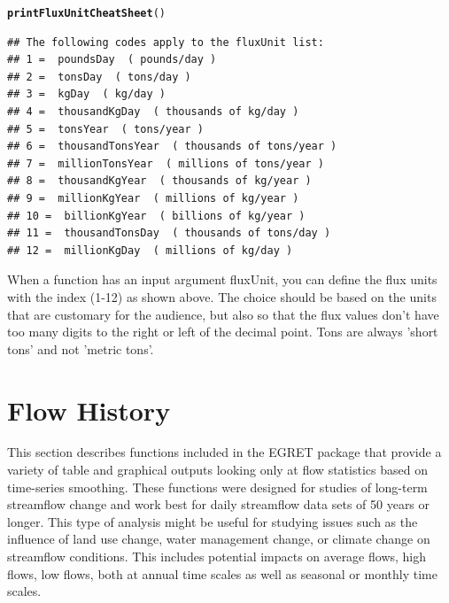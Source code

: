 \documentclass[a4paper,11pt]{article}\usepackage{graphicx, color}
\makeatletter
\newcommand{\hlfunctioncall}[1]{\textcolor[rgb]{0.501960784313725,0,0.329411764705882}{\textbf{#1}}}%
\newenvironment{kframe}{%
 \def\at@end@of@kframe{}%
 \ifinner\ifhmode%
  \def\at@end@of@kframe{\end{minipage}}%
  \begin{minipage}{\columnwidth}%
 \fi\fi%
 \def\FrameCommand##1{\hskip\@totalleftmargin \hskip-\fboxsep
 \colorbox{shadecolor}{##1}\hskip-\fboxsep
     \hskip-\linewidth \hskip-\@totalleftmargin \hskip\columnwidth}%
 \MakeFramed {\advance\hsize-\width
   \@totalleftmargin\z@ \linewidth\hsize
   \@setminipage}}%
 {\par\unskip\endMakeFramed%
 \at@end@of@kframe}
\newenvironment{knitrout}{}{} %
\makeatother
\begin{document}
\begin{knitrout}
\color{fgcolor}\begin{kframe}
\begin{alltt}
\hlfunctioncall{printFluxUnitCheatSheet}()
\end{alltt}
\begin{verbatim}
## The following codes apply to the fluxUnit list:
## 1 =  poundsDay  ( pounds/day )
## 2 =  tonsDay  ( tons/day )
## 3 =  kgDay  ( kg/day )
## 4 =  thousandKgDay  ( thousands of kg/day )
## 5 =  tonsYear  ( tons/year )
## 6 =  thousandTonsYear  ( thousands of tons/year )
## 7 =  millionTonsYear  ( millions of tons/year )
## 8 =  thousandKgYear  ( thousands of kg/year )
## 9 =  millionKgYear  ( millions of kg/year )
## 10 =  billionKgYear  ( billions of kg/year )
## 11 =  thousandTonsDay  ( thousands of tons/day )
## 12 =  millionKgDay  ( millions of kg/day )
\end{verbatim}
\end{kframe}
\end{knitrout}


When a function has an input argument fluxUnit, you can define the flux units with the index (1-12) as shown above. The choice should be based on the units that are customary for the audience, but also so that the flux values don't have too many digits to the right or left of the decimal point. Tons are always 'short tons' and not 'metric tons'.

\FloatBarrier

\section{Flow History}
\label{sec:flowHistory}
This section describes functions included in the EGRET package that provide a variety of table and graphical outputs looking only at flow statistics based on time-series smoothing. These functions were designed for studies of long-term streamflow change and work best for daily streamflow data sets of 50 years or longer. This type of analysis might be useful for studying issues such as the influence of land use change, water management change, or climate change on streamflow conditions.  This includes potential impacts on average flows, high flows, low flows, both at annual time scales as well as seasonal or monthly time scales. 
\end{document}
